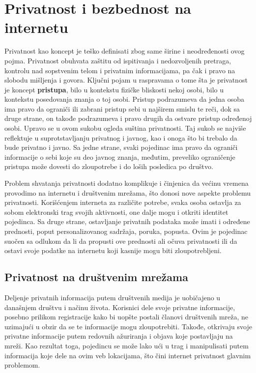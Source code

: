 \documentclass[12pt, a4paper]{article}
\begin{document}
{\section{Privatnost i bezbednost na internetu}	
\label{sec:sigurnost}

Privatnost kao koncept je teško definisati zbog same širine i neodređenosti ovog pojma. Privatnost obuhvata zaštitu od ispitivanja i nedozvoljenih pretraga,
kontrolu nad sopstvenim telom i privatnim informacijama, pa čak i pravo
na slobodu mišljenja i govora. Ključni pojam u raspravama o tome šta
je privatnost je koncept \textbf{pristupa}, bilo u kontekstu fizičke bliskosti nekoj
osobi, bilo u kontekstu posedovanja znanja o toj osobi. Pristup podrazumeva da jedna osoba ima pravo da ograniči ili zabrani pristup sebi
u najširem smislu te reči, dok sa druge strane, on takođe podrazumeva i
pravo drugih da ostvare pristup određenoj osobi. Upravo se u ovom sukobu ogleda suština privatnosti. Taj sukob se najviše reflektuje u suprotstavljanju privatnog i javnog, kao i onoga što bi trebalo da bude privatno i javno. Sa jedne strane, svaki pojedinac ima pravo da ograniči informacije o sebi koje su deo javnog znanja, međutim, preveliko ograničenje pristupa može dovesti do zloupotrebe i do loših posledica po društvo.

Problem shvatanja privatnosti dodatno komplikuje i činjenica da većinu vremena provodimo na internetu i društvenim mrežama, što donosi nove aspekte problemu privatnosti. Korišćenjem interneta za različite potrebe, svaka osoba ostavlja za sobom elektronski trag svojih aktivnosti, one dalje mogu i otkriti identitet pojedinca. Sa druge strane, ostavljanje privatnih podataka može imati i određene prednosti, poput personalizovanog sadržaja, poruka, popusta. Ovim je pojedinac suočen sa odlukom  da li da propusti ove prednosti ali očuva privatnosti ili da ostavi svoje podatke na internetu koji kasnije mogu biti zloupotrebljeni.


\subsection{Privatnost na društvenim mrežama}

Deljenje privatnih informacija putem društvenih medija je uobičajeno u današnjem društvu i načinu života. Korisnici dele svoje privatne informacije, posebno prilikom registracije kako bi uopšte postali članovi društvenih mreža, ne uzimajući u obzir da se te informacije mogu zloupotrebiti. 
Takođe, otkrivaju svoje privatne informacije putem redovnih ažuriranja i objava koje postavljaju na mreži. Kao rezultat toga, pojedincu se može lako ući u trag i manipulisati putem informacija koje dele na ovim veb lokacijama, što čini internet privatnost glavnim problemom.


}
\end{document}

